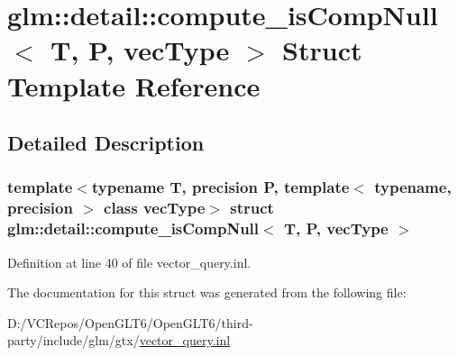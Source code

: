 \hypertarget{structglm_1_1detail_1_1compute__is_comp_null}{}\section{glm\+::detail\+::compute\+\_\+is\+Comp\+Null$<$ T, P, vec\+Type $>$ Struct Template Reference}
\label{structglm_1_1detail_1_1compute__is_comp_null}


\subsection{Detailed Description}
\subsubsection*{template$<$typename T, precision P, template$<$ typename, precision $>$ class vec\+Type$>$\newline
struct glm\+::detail\+::compute\+\_\+is\+Comp\+Null$<$ T, P, vec\+Type $>$}



Definition at line 40 of file vector\+\_\+query.\+inl.



The documentation for this struct was generated from the following file\+:\begin{DoxyCompactItemize}
\item 
D\+:/\+V\+C\+Repos/\+Open\+G\+L\+T6/\+Open\+G\+L\+T6/third-\/party/include/glm/gtx/\mbox{\hyperlink{vector__query_8inl}{vector\+\_\+query.\+inl}}\end{DoxyCompactItemize}
